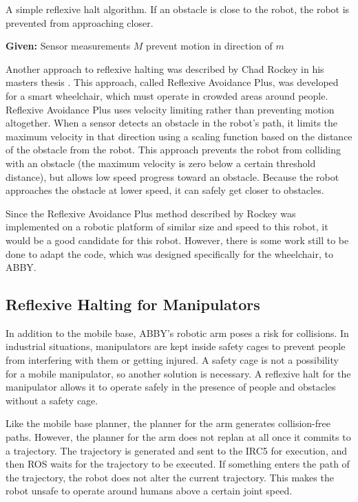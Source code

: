 \documentclass[]{cwru} %
\begin{document}
\begin{algorithm}
\caption{A simple reflexive halt
algorithm. If an obstacle is close to the robot, the robot is prevented
from approaching closer.}
\label{alg:reflexive-halt}
\begin{algorithmic}
\STATE \textbf{Given:} Sensor measurements $M$
    \STATE prevent motion in direction of $m$
  \ENDIF
\ENDFOR
\end{algorithmic}
\end{algorithm}

Another approach to reflexive halting was described by Chad Rockey in
his masters thesis \cite{rockey}. This approach, called Reflexive Avoidance
Plus, was developed for a smart wheelchair, which must operate in
crowded areas around people. Reflexive Avoidance Plus uses velocity
limiting rather than preventing motion altogether. When a sensor detects
an obstacle in the robot's path, it limits the maximum velocity in that
direction using a scaling function based on the distance of the obstacle
from the robot. This approach prevents the robot from colliding with an
obstacle (the maximum velocity is zero below a certain threshold
distance), but allows low speed progress toward an obstacle. Because the
robot approaches the obstacle at lower speed, it can safely get closer
to obstacles.

Since the Reflexive Avoidance Plus method described by Rockey was
implemented on a robotic platform of similar size and speed to this
robot, it would be a good candidate for this robot. However, there is
some work still to be done to adapt the code, which was designed
specifically for the wheelchair, to ABBY.

\subsection{Reflexive Halting for Manipulators}

In addition to the mobile base, ABBY's robotic arm poses a risk for
collisions. In industrial situations, manipulators are kept inside
safety cages to prevent people from interfering with them or getting
injured. A safety cage is not a possibility for a mobile manipulator, so
another solution is necessary. A reflexive halt for the manipulator
allows it to operate safely in the presence of people and obstacles
without a safety cage.

Like the mobile base planner, the planner for the arm generates
collision-free paths. However, the planner for the arm does not replan
at all once it commits to a trajectory. The trajectory is generated and
sent to the IRC5 for execution, and then ROS waits for the trajectory to
be executed. If something enters the path of the trajectory, the robot
does not alter the current trajectory. This makes the robot unsafe to
operate around humans above a certain joint speed.
\end{document}
